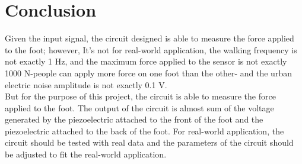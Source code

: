 
\section{Conclusion}
Given the input signal, the circuit designed is able to measure the force applied to the foot; however, It's not for real-world application, the walking frequency is not exactly 1 Hz, and the maximum force applied to the sensor is not exactly 1000 N-people can apply more force on one foot than the other- and the urban electric noise amplitude is not exactly 0.1 V. \\
But for the purpose of this project, the circuit is able to measure the force applied to the foot. The output of the circuit is almost sum of the voltage generated by the piezoelectric attached to the front of the foot and the piezoelectric attached to the back of the foot. For real-world application, the circuit should be tested with real data and the parameters of the circuit should be adjusted to fit the real-world application.\\